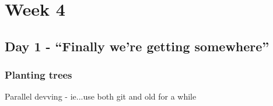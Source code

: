 \cleardoublepage
\chapter{Week 4}
\section{Day 1 - ``Finally we're getting somewhere''}
\subsection{Planting trees}


Parallel devving - ie...use both git and old for a while
